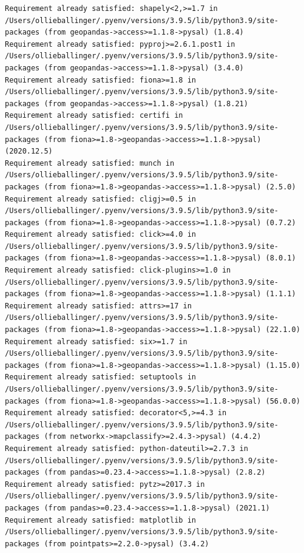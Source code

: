 \documentclass[
  letterpaper,
  DIV=11,
  numbers=noendperiod]{scrreprt}
\begin{document}
\begin{verbatim}
Requirement already satisfied: shapely<2,>=1.7 in /Users/ollieballinger/.pyenv/versions/3.9.5/lib/python3.9/site-packages (from geopandas->access>=1.1.8->pysal) (1.8.4)
Requirement already satisfied: pyproj>=2.6.1.post1 in /Users/ollieballinger/.pyenv/versions/3.9.5/lib/python3.9/site-packages (from geopandas->access>=1.1.8->pysal) (3.4.0)
Requirement already satisfied: fiona>=1.8 in /Users/ollieballinger/.pyenv/versions/3.9.5/lib/python3.9/site-packages (from geopandas->access>=1.1.8->pysal) (1.8.21)
Requirement already satisfied: certifi in /Users/ollieballinger/.pyenv/versions/3.9.5/lib/python3.9/site-packages (from fiona>=1.8->geopandas->access>=1.1.8->pysal) (2020.12.5)
Requirement already satisfied: munch in /Users/ollieballinger/.pyenv/versions/3.9.5/lib/python3.9/site-packages (from fiona>=1.8->geopandas->access>=1.1.8->pysal) (2.5.0)
Requirement already satisfied: cligj>=0.5 in /Users/ollieballinger/.pyenv/versions/3.9.5/lib/python3.9/site-packages (from fiona>=1.8->geopandas->access>=1.1.8->pysal) (0.7.2)
Requirement already satisfied: click>=4.0 in /Users/ollieballinger/.pyenv/versions/3.9.5/lib/python3.9/site-packages (from fiona>=1.8->geopandas->access>=1.1.8->pysal) (8.0.1)
Requirement already satisfied: click-plugins>=1.0 in /Users/ollieballinger/.pyenv/versions/3.9.5/lib/python3.9/site-packages (from fiona>=1.8->geopandas->access>=1.1.8->pysal) (1.1.1)
Requirement already satisfied: attrs>=17 in /Users/ollieballinger/.pyenv/versions/3.9.5/lib/python3.9/site-packages (from fiona>=1.8->geopandas->access>=1.1.8->pysal) (22.1.0)
Requirement already satisfied: six>=1.7 in /Users/ollieballinger/.pyenv/versions/3.9.5/lib/python3.9/site-packages (from fiona>=1.8->geopandas->access>=1.1.8->pysal) (1.15.0)
Requirement already satisfied: setuptools in /Users/ollieballinger/.pyenv/versions/3.9.5/lib/python3.9/site-packages (from fiona>=1.8->geopandas->access>=1.1.8->pysal) (56.0.0)
Requirement already satisfied: decorator<5,>=4.3 in /Users/ollieballinger/.pyenv/versions/3.9.5/lib/python3.9/site-packages (from networkx->mapclassify>=2.4.3->pysal) (4.4.2)
Requirement already satisfied: python-dateutil>=2.7.3 in /Users/ollieballinger/.pyenv/versions/3.9.5/lib/python3.9/site-packages (from pandas>=0.23.4->access>=1.1.8->pysal) (2.8.2)
Requirement already satisfied: pytz>=2017.3 in /Users/ollieballinger/.pyenv/versions/3.9.5/lib/python3.9/site-packages (from pandas>=0.23.4->access>=1.1.8->pysal) (2021.1)
Requirement already satisfied: matplotlib in /Users/ollieballinger/.pyenv/versions/3.9.5/lib/python3.9/site-packages (from pointpats>=2.2.0->pysal) (3.4.2)

\end{verbatim}
\end{document}
